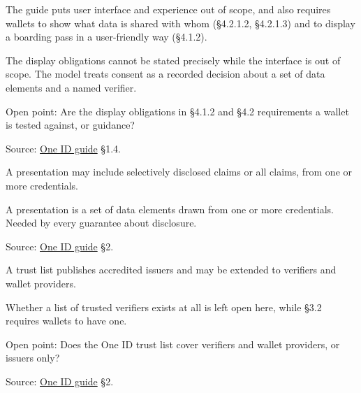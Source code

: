 \begin{definition}
  \label{def:c05}
  \notready
  The guide puts user interface and experience out of scope, and also
  requires wallets to show what data is shared with whom (§4.2.1.2, §4.2.1.3)
  and to display a boarding pass in a user-friendly way (§4.1.2).

  The display obligations cannot be stated precisely while the interface is
  out of scope. The model treats consent as a recorded decision about a set
  of data elements and a named verifier.

  Open point: Are the display obligations in §4.1.2 and §4.2 requirements a
  wallet is tested against, or guidance?

  Source:
  \href{https://standards.atlassian.net/wiki/spaces/OneID/pages/2947416082/Technical+Implementation+Guide}{One
  ID guide} §1.4.
\end{definition}

\begin{definition}
  \label{def:c07}
  A presentation may include selectively disclosed claims or all claims, from
  one or more credentials.

  A presentation is a set of data elements drawn from one or more
  credentials. Needed by every guarantee about disclosure.

  Source:
  \href{https://standards.atlassian.net/wiki/spaces/OneID/pages/2947416082/Technical+Implementation+Guide}{One
  ID guide} §2.
\end{definition}

\begin{definition}
  \label{def:c08}
  \notready
  A trust list publishes accredited issuers and may be extended to verifiers
  and wallet providers.

  Whether a list of trusted verifiers exists at all is left open here, while
  §3.2 requires wallets to have one.

  Open point: Does the One ID trust list cover verifiers and wallet
  providers, or issuers only?

  Source:
  \href{https://standards.atlassian.net/wiki/spaces/OneID/pages/2947416082/Technical+Implementation+Guide}{One
  ID guide} §2.
\end{definition}
